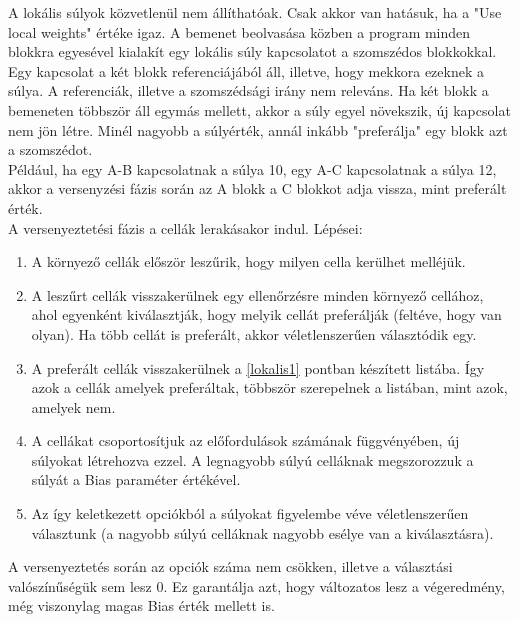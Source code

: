 A lokális súlyok közvetlenül nem állíthatóak. Csak akkor van hatásuk, ha a "Use local weights" értéke igaz. A bemenet beolvasása közben a program minden blokkra egyesével kialakít egy lokális súly kapcsolatot a szomszédos blokkokkal. Egy kapcsolat a két blokk referenciájából áll, illetve, hogy mekkora ezeknek a súlya. A referenciák, illetve a szomszédsági irány nem releváns. Ha két blokk a bemeneten többször áll egymás mellett, akkor a súly egyel növekszik, új kapcsolat nem jön létre. Minél nagyobb a súlyérték, annál inkább "preferálja" egy blokk azt a szomszédot.\\
Például, ha egy A-B kapcsolatnak a súlya 10, egy A-C kapcsolatnak a súlya 12, akkor a versenyzési fázis során az A blokk a C blokkot adja vissza, mint preferált érték.\\
A versenyeztetési fázis a cellák lerakásakor indul. Lépései:
\begin{enumerate}
    \item \label{lokalis1} A környező cellák először leszűrik, hogy milyen cella kerülhet melléjük.
    \item  A leszűrt cellák visszakerülnek egy ellenőrzésre minden környező cellához, ahol egyenként kiválasztják, hogy melyik cellát preferálják (feltéve, hogy van olyan). Ha több cellát is preferált, akkor véletlenszerűen választódik egy.
    \item A preferált cellák visszakerülnek a \ref{lokalis1} pontban készített listába. Így azok a cellák amelyek preferáltak, többször szerepelnek a listában, mint azok, amelyek nem.
    \item A cellákat csoportosítjuk az előfordulások számának függvényében, új súlyokat létrehozva ezzel. A legnagyobb súlyú celláknak megszorozzuk a súlyát a Bias paraméter értékével.
    \item Az így keletkezett opciókból a súlyokat figyelembe véve véletlenszerűen választunk (a nagyobb súlyú celláknak nagyobb esélye van a kiválasztásra).
\end{enumerate}
A versenyeztetés során az opciók száma nem csökken, illetve a választási valószínűségük sem lesz 0. Ez garantálja azt, hogy változatos lesz a végeredmény, még viszonylag magas Bias érték mellett is.



